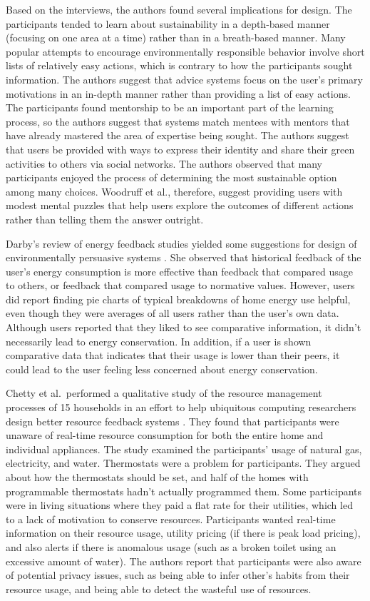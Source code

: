 Based on the interviews, the authors found several implications for design. The participants tended to learn about sustainability in a depth-based manner (focusing on one area at a time) rather than in a breath-based manner. Many popular attempts to encourage environmentally responsible behavior involve short lists of relatively easy actions, which is contrary to how the participants sought information. The authors suggest that advice systems focus on the user's primary motivations in an in-depth manner rather than providing a list of easy actions. The participants found mentorship to be an important part of the learning process, so the authors suggest that systems match mentees with mentors that have already mastered the area of expertise being sought. The authors suggest that users be provided with ways to express their identity and share their green activities to others via social networks. The authors observed that many participants enjoyed the process of determining the most sustainable option among many choices. Woodruff et al., therefore, suggest providing users with modest mental puzzles that help users explore the outcomes of different actions rather than telling them the answer outright.

Darby's review of energy feedback studies yielded some suggestions for design of environmentally persuasive systems \cite{darby-review-2006}. She observed that historical feedback of the user's energy consumption is more effective than feedback that compared usage to others, or feedback that compared usage to normative values. However, users did report finding pie charts of typical breakdowns of home energy use helpful, even though they were averages of all users rather than the user's own data. Although users reported that they liked to see comparative information, it didn't necessarily lead to energy conservation. In addition, if a user is shown comparative data that indicates that their usage is lower than their peers, it could lead to the user feeling less concerned about energy conservation.

Chetty et al.\ performed a qualitative study of the resource management processes of 15 households in an effort to help ubiquitous computing researchers design better resource feedback systems \cite{chetty-2008}. They found that participants were unaware of real-time resource consumption for both the entire home and individual appliances. The study examined the participants' usage of natural gas, electricity, and water. Thermostats were a problem for participants. They argued about how the thermostats should be set, and half of the homes with programmable thermostats hadn't actually programmed them. Some participants were in living situations where they paid a flat rate for their utilities, which led to a lack of motivation to conserve resources. Participants wanted real-time information on their resource usage, utility pricing (if there is peak load pricing), and also alerts if there is anomalous usage (such as a broken toilet using an excessive amount of water). The authors report that participants were also aware of potential privacy issues, such as being able to infer other's habits from their resource usage, and being able to detect the wasteful use of resources.

